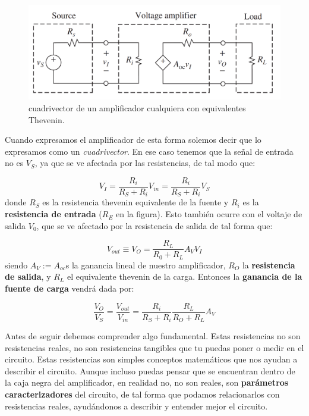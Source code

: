 \documentclass[12pt,a4paper]{article}
\numberwithin{equation}{section}
\numberwithin{figure}{section}
\begin{document}
\begin{figure}[h!] \centering
\includegraphics[scale=0.35]{1.1-Cuadrivector.png}
\caption{cuadrivector de un amplificador cualquiera con equivalentes Thevenin.}
\label{Fig:1.1-Cuadrivector}
\end{figure}

Cuando expresamos el amplificador de esta forma solemos decir que lo expresamos como un \textit{cuadrivector}. En ese caso tenemos que la señal de entrada no es $V_S$, ya que se ve afectada por las resistencias, de tal modo que:

\begin{equation}
 V_I = \dfrac{R_i}{R_S + R_i} V_{in}= \dfrac{R_i}{R_S + R_i} V_{S}
\end{equation}
donde $R_S$ es la resistencia thevenin equivalente de la fuente y $R_i$ es la \textbf{resistencia de entrada} ($R_E$ en la figura). Esto también ocurre con el voltaje de salida $V_0$, que se ve afectado por la resistencia de salida de tal forma que:

\begin{equation}
V_{out} \equiv V_O = \dfrac{R_L}{R_0 + R_L} A_V V_I
\end{equation}
siendo $A_V := A_{oc}$s la ganancia lineal de nuestro amplificador, $R_O$ la \textbf{resistencia de salida}, y $R_L$ el equivalente thevenin de la carga. Entonces la \textbf{ganancia de la fuente de carga} vendrá dada por:

\begin{equation}
\dfrac{V_O}{V_S} = \dfrac{V_{out}}{V_{in}} = \dfrac{R_{i}}{R_S + R_i} \dfrac{R_L}{R_O + R_L} A_V
\end{equation}

Antes de seguir debemos comprender algo fundamental. Estas resistencias no son resistencias reales, no son resistencias tangibles que tu puedas poner o medir en el circuito. Estas resistencias son simples conceptos matemáticos que nos ayudan a describir el circuito. Aunque incluso puedas pensar que se encuentran dentro de la caja negra del amplificador, en realidad no, no son reales, son \textbf{parámetros caracterizadores} del circuito, de tal forma que podamos relacionarlos con resistencias reales, ayudándonos a describir y entender mejor el circuito. \\
\end{document}
